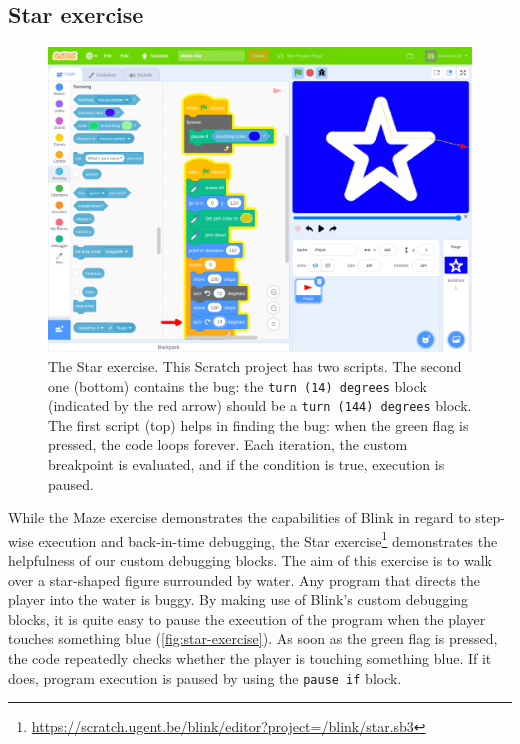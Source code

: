 \documentclass[../main]{subfiles}
\begin{document}
\subsection{Star exercise}\label{subsec:star-exercise}

\begin{figure}
    \begin{wide}
        \includegraphics[width=\linewidth]{draw-star}
    \end{wide}
    \caption{
        The Star exercise.
        This Scratch project has two scripts.
        The second one (bottom) contains the bug: the \texttt{turn (14) degrees} block (indicated by the red arrow) should be a \texttt{turn (144) degrees} block.
        The first script (top) helps in finding the bug: when the green flag is pressed, the code loops forever.
        Each iteration, the custom breakpoint is evaluated, and if the condition is true, execution is paused.
    }
    \label{fig:star-exercise}
\end{figure}

While the Maze exercise demonstrates the capabilities of Blink in regard to step-wise execution and back-in-time debugging, the Star exercise\footnote{\url{https://scratch.ugent.be/blink/editor?project=/blink/star.sb3}} demonstrates the helpfulness of our custom debugging blocks.
The aim of this exercise is to walk over a star-shaped figure surrounded by water.
Any program that directs the player into the water is buggy.
By making use of Blink's custom debugging blocks, it is quite easy to pause the execution of the program when the player touches something blue (\vref{fig:star-exercise}).
As soon as the green flag is pressed, the code repeatedly checks whether the player is touching something blue.
If it does, program execution is paused by using the \texttt{pause if} block.
\end{document}
